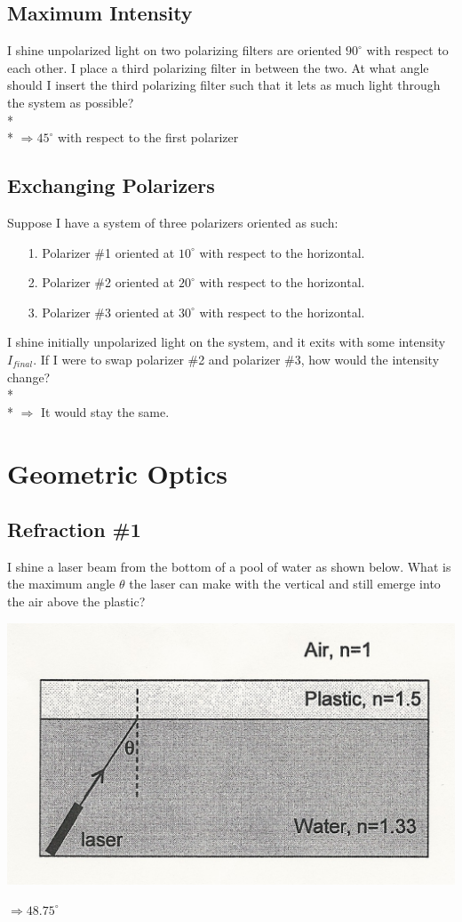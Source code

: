 \documentclass[11pt]{article}
\begin{document}
\subsection{Maximum Intensity}
I shine unpolarized light on two polarizing filters are oriented $90^\circ$ with respect to each other.  I place a third polarizing filter in between the two.  At what angle should I insert the third polarizing filter such that it lets as much light through the system as possible? \\* \\*
$\Rightarrow 45^\circ$ with respect to the first polarizer

\subsection{Exchanging Polarizers}
Suppose I have a system of three polarizers oriented as such:
\begin{itemize}
\item[1.] Polarizer \#1 oriented at $10^\circ$ with respect to the horizontal.
\item[2.] Polarizer \#2 oriented at $20^\circ$ with respect to the horizontal.
\item[3.] Polarizer \#3 oriented at $30^\circ$ with respect to the horizontal.
\end{itemize}
I shine initially unpolarized light on the system, and it exits with some intensity $I_{final}$.  If I were to swap polarizer \#2 and polarizer \#3, how would the intensity change? \\* \\*
$\Rightarrow$ It would stay the same.


\pagebreak
\section{Geometric Optics}
\vspace{10pt}

\subsection{Refraction \#1}
I shine a laser beam from the bottom of a pool of water as shown below.  What is the maximum angle $\theta$ the laser can make with the vertical and still emerge into the air above the plastic?

\begin{center}
\includegraphics[scale=0.2]{Images/slab_of_water_and_plastic.jpg}
\end{center}

$\Rightarrow 48.75^\circ$

\end{document}
